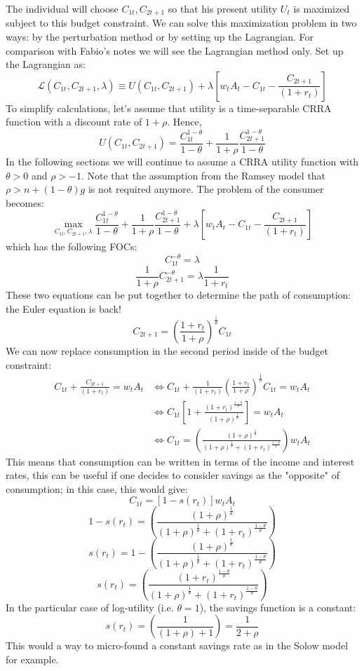 \documentclass[12pt]{report}
\begin{document}
The individual will choose $C_{1t}, C_{2t+1}$ so that his present utility $U_t$ is maximized subject to this budget constraint. We can solve this maximization problem in two ways: by the perturbation method or by setting up the Lagrangian. For comparison with Fabio's notes we will see the Lagrangian method only. Set up the Lagrangian as: $$\mathcal{L}(C_{1t},C_{2t+1},\lambda) \equiv  U(C_{1t}, C_{2t+1}) + \lambda \left[w_tA_t - C_{1t} - \frac{C_{2t+1}}{(1+r_t)}\right] $$ To simplify calculations, let's assume that utility is a time-separable CRRA function with a discount rate of $1+\rho$. Hence, $$ U(C_{1t}, C_{2t+1}) = \frac{C_{1t}^{1-\theta}}{1-\theta} + \frac{1}{1+\rho}\frac{C_{2t+1}^{1-\theta}}{1-\theta} $$ In the following sections we will continue to assume a CRRA utility function with $\theta > 0$ and $\rho > -1$. Note that the assumption from the Ramsey model that $\rho > n + (1-\theta)g$ is not required anymore. The problem of the consumer becomes: $$\max_{C_{1t},C_{2t+1},\lambda} \frac{C_{1t}^{1-\theta}}{1-\theta} + \frac{1}{1+\rho}\frac{C_{2t+1}^{1-\theta}}{1-\theta} + \lambda \left[w_tA_t - C_{1t} - \frac{C_{2t+1}}{(1+r_t)}\right] $$ which has the following FOCs: $$C_{1t}^{-\theta} = \lambda $$ $$\frac{1}{1+\rho} C_{2t+1}^{-\theta} = \lambda \frac{1}{1+r_t} $$ These two equations can be put together to determine the path of consumption: the Euler equation is back! $$ C_{2t+1} = \left(\frac{1+r_t}{1+\rho}\right)^{\frac{1}{\theta}} C_{1t}$$ We can now replace consumption in the second period inside of the budget constraint: \begin{align*}
C_{1t} + \frac{C_{2t+1}}{(1+r_t)} = w_tA_t & \Leftrightarrow C_{1t} + \frac{1}{(1+r_t)}\left(\frac{1+r_t}{1+\rho}\right)^{\frac{1}{\theta}} C_{1t}  = w_tA_t \\
& \Leftrightarrow C_{1t}\left[ 1 + \frac{(1+r_t)^{\frac{1 - \theta}{\theta}}}{(1+\rho)^{\frac{1}{\theta}}}\right ]  = w_tA_t \\
& \Leftrightarrow C_{1t} = \left( \frac{(1+\rho)^{\frac{1}{\theta}}}{(1+\rho)^{\frac{1}{\theta}} + (1+r_t)^{\frac{1 - \theta}{\theta}}}\right ) w_tA_t
\end{align*} This means that consumption can be written in terms of the income and interest rates, this can be useful if one decides to consider savings as the "opposite" of consumption; in this case, this would give: $$C_{1t} = [1 - s(r_t)] w_tA_t $$ $$ 1 - s(r_t) = \left( \frac{(1+\rho)^{\frac{1}{\theta}}}{(1+\rho)^{\frac{1}{\theta}} + (1+r_t)^{\frac{1 - \theta}{\theta}}}\right ) $$ $$ s(r_t) = 1 - \left( \frac{(1+\rho)^{\frac{1}{\theta}}}{(1+\rho)^{\frac{1}{\theta}} + (1+r_t)^{\frac{1 - \theta}{\theta}}}\right ) $$ $$ s(r_t) = \left( \frac{(1+r_t)^{\frac{1 - \theta}{\theta}}}{(1+\rho)^{\frac{1}{\theta}} + (1+r_t)^{\frac{1 - \theta}{\theta}}}\right)$$ In the particular case of log-utility (i.e. $\theta = 1$), the savings function is a constant: $$s(r_t) = \left( \frac{1}{(1+\rho) + 1}\right) = \frac{1}{2 + \rho}$$ This would a way to micro-found a constant savings rate as in the Solow model for example.
\end{document}
